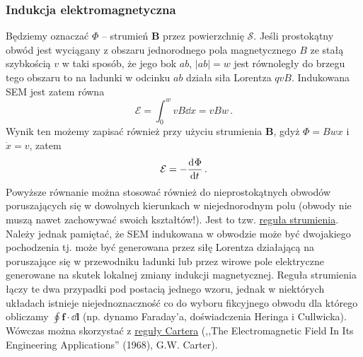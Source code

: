 \documentclass[../main.tex]{subfiles}
\begin{document}
    \subsubsection{Indukcja elektromagnetyczna}
    Będziemy oznaczać \(\Phi\) -- strumień \(\mathbf{B}\) przez powierzchnię \(\mathcal{S}\). Jeśli prostokątny obwód jest wyciągany z obszaru jednorodnego pola magnetycznego \(B\) ze stałą szybkością \(v\) w taki sposób, że jego bok \(ab\), \(|ab|=w\) jest równoległy do brzegu tego obszaru to na ładunki w odcinku \(ab\) działa siła Lorentza \(qvB\). Indukowana SEM jest zatem równa
    \begin{equation*}
        \mathcal{E}=\int_0^wvB\dd{x}=vBw\,.
    \end{equation*}
    Wynik ten możemy zapisać również przy użyciu strumienia \(\mathbf{B}\), gdyż \(\Phi=Bwx\) i \(\dot x=v\), zatem
    \begin{equation*}
        \mathcal{E}=-\dv[]{\Phi}{t}\,.
    \end{equation*}
    Powyższe równanie można stosować również do nieprostokątnych obwodów poruszających się w dowolnych kierunkach w niejednorodnym polu (obwody nie muszą nawet zachowywać swoich kształtów!). Jest to tzw. \underline{reguła strumienia}. Należy jednak pamiętać, że SEM indukowana w obwodzie może być dwojakiego pochodzenia tj. może być generowana przez siłę Lorentza działającą na poruszające się w przewodniku ładunki lub przez wirowe pole elektryczne generowane na skutek lokalnej zmiany indukcji magnetycznej. Reguła strumienia łączy te dwa przypadki pod postacią jednego wzoru, jednak w niektórych układach istnieje niejednoznaczność co do wyboru fikcyjnego obwodu dla którego obliczamy \(\oint\mathbf{f}\cdot\dd{\mathbf{l}}\) (np. dynamo Faraday'a, doświadczenia Heringa i Cullwicka). Wówczas można skorzystać z \underline{reguły Cartera} (,,The Electromagnetic Field In Its Engineering Applications'' (1968), G.W. Carter).
    \medskip
    
        \noindent{}
\end{document}

